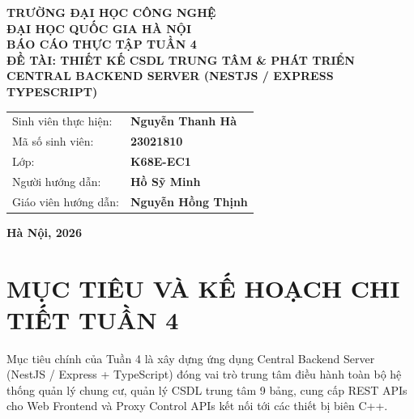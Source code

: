 \documentclass[12pt,a4paper]{article}
\begin{document}
\begin{titlepage}

\begin{center}
    \textbf{\fontsize{14}{17}\selectfont TRƯỜNG ĐẠI HỌC CÔNG NGHỆ} \\
    \textbf{\fontsize{12}{15}\selectfont ĐẠI HỌC QUỐC GIA HÀ NỘI} \\
    
    \vspace{2.5cm}
    \textbf{\fontsize{18}{22}\selectfont BÁO CÁO THỰC TẬP TUẦN 4} \\[0.5cm]
    \textbf{\fontsize{13}{16}\selectfont ĐỀ TÀI: THIẾT KẾ CSDL TRUNG TÂM \& PHÁT TRIỂN} \\
    \textbf{\fontsize{13}{16}\selectfont CENTRAL BACKEND SERVER (NESTJS / EXPRESS TYPESCRIPT)} \\
    
    \vspace{3.5cm}
    \fontsize{12}{15}\selectfont
    \begin{tabular}{ll}
        Sinh viên thực hiện: & \textbf{Nguyễn Thanh Hà} \\
        Mã số sinh viên: & \textbf{23021810} \\
        Lớp: & \textbf{K68E-EC1} \\
        Người hướng dẫn: & \textbf{Hồ Sỹ Minh} \\
        Giáo viên hướng dẫn: & \textbf{Nguyễn Hồng Thịnh} \\
    \end{tabular}
    
    \vfill
    \textbf{Hà Nội, 2026}
\end{center}
\end{titlepage}

\newpage
\tableofcontents
\newpage

\section{MỤC TIÊU VÀ KẾ HOẠCH CHI TIẾT TUẦN 4}
Mục tiêu chính của Tuần 4 là xây dựng ứng dụng Central Backend Server (NestJS / Express + TypeScript) đóng vai trò trung tâm điều hành toàn bộ hệ thống quản lý chung cư, quản lý CSDL trung tâm 9 bảng, cung cấp REST APIs cho Web Frontend và Proxy Control APIs kết nối tới các thiết bị biên C++.
\end{document}
